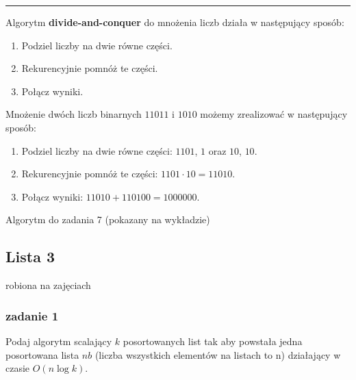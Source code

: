 \documentclass[11pt,a4paper]{article}
\begin{document}
\bigskip
\hrule
\bigskip

Algorytm \textbf{divide-and-conquer} do mnożenia liczb działa w następujący sposób:
\begin{enumerate}
    \item Podziel liczby na dwie równe części.
    \item Rekurencyjnie pomnóż te części.
    \item Połącz wyniki.
\end{enumerate}

Mnożenie dwóch liczb binarnych $11011$ i $1010$ możemy zrealizować w następujący sposób:
\begin{enumerate}
    \item Podziel liczby na dwie równe części: $1101$, $1$ oraz $10$, $10$.
    \item Rekurencyjnie pomnóż te części: $1101 \cdot 10 = 11010$.
    \item Połącz wyniki: $11010 + 110100 = 1000000$.
\end{enumerate}

\begin{algorithm}
\caption{Algorytm do zadania 7 (pokazany na wykładzie)}
    \begin{algorithmic}[1]
        \State {}
        \EndIf
        \State {}
    \end{algorithmic}
\end{algorithm}

\subsection{Lista 3}
robiona na zajęciach \date{2025-03-24}

\subsubsection{zadanie 1}
Podaj algorytm scalający $k$ posortowanych list tak aby powstała jedna posortowana lista $nb$ (liczba wszystkich elementów na listach to n) działający w czasie $O(n \log k)$.
\end{document}
